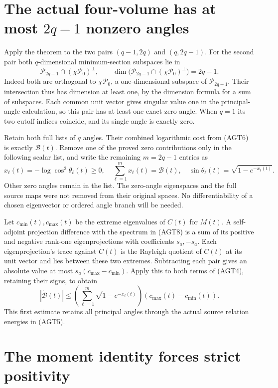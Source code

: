 \documentclass{article}
\newcommand{\cP}{\mathcal P}
\begin{document}
\section{The actual four-volume has at most \texorpdfstring{$2q-1$}{2q-1} nonzero angles}

Apply the theorem to the two pairs $(q-1,2q)$ and $(q,2q-1)$.
For the second pair both $q$-dimensional minimum-section
subspaces lie in
\[
 \cP_{2q-1}\cap(\chi\cP_0)^\perp,
 \qquad\dim\bigl(\cP_{2q-1}\cap(\chi\cP_0)^\perp\bigr)=2q-1.
 \tag{AGT9}
\]
Indeed both are orthogonal to $\chi\cP_0$, a one-dimensional
subspace of $\cP_{2q-1}$. Their intersection thus has dimension
at least one, by the dimension formula for a sum of subspaces.
Each common unit vector gives singular value one in the
principal-angle calculation, so this pair has at least one
exact zero angle. When $q=1$ its two cutoff indices coincide,
and its single angle is exactly zero.

Retain both full lists of $q$ angles. Their combined logarithmic
cost from (AGT6) is exactly $\mathcal B(t)$. Remove one of the
proved zero contributions only in the following scalar list,
and write the remaining $m=2q-1$ entries as
\[
 x_\ell(t)=-\log\cos^2\theta_\ell(t)\ge0,
 \quad\sum_{\ell=1}^{m}x_\ell(t)=\mathcal B(t),
 \quad\sin\theta_\ell(t)=\sqrt{1-e^{-x_\ell(t)}}.
 \tag{AGT10}
\]
Other zero angles remain in the list. The zero-angle eigenspaces
and the full source maps were not removed from their original
spaces. No differentiability of a chosen eigenvector or ordered
angle branch will be needed.

Let $c_{\min}(t),c_{\max}(t)$ be the extreme eigenvalues of
$C(t)$ for $M(t)$. A self-adjoint projection difference with
the spectrum in (AGT8) is a sum of its positive and negative
rank-one eigenprojections with coefficients $s_a,-s_a$.
Each eigenprojection's trace against $C(t)$ is the Rayleigh
quotient of $C(t)$ at its unit vector and lies between these
two extremes. Subtracting each pair gives an absolute value
at most $s_a(c_{\max}-c_{\min})$. Apply this to both terms
of (AGT4), retaining their signs, to obtain
\[
 |\dot{\mathcal B}(t)|
 \le\left(\sum_{\ell=1}^{m}\sqrt{1-e^{-x_\ell(t)}}\right)
                       (c_{\max}(t)-c_{\min}(t)).
 \tag{AGT11}
\]
This first estimate retains all principal angles through the
actual source relation energies in (AGT5).

\section{The moment identity forces strict positivity}
\end{document}

